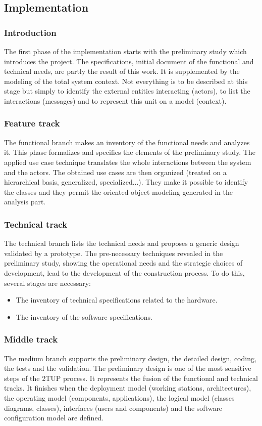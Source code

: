 \subsection{Implementation}
\label{subsec:subsec01}
\subsubsection{Introduction}
\label{subsec:subsec01}
The first phase of the implementation starts with the
preliminary study which introduces the project. The
specifications, initial document of the functional and
technical needs, are partly the result of this work. It is
supplemented by the modeling of the total system context.
Not everything is to be described at this stage but simply
to identify the external entities interacting (actors), to list
the interactions (messages) and to represent this unit on a
model (context).
\subsubsection{Feature track}
\label{subsec:subsec01}
The functional branch makes an inventory of the
functional needs and analyzes it. This phase formalizes
and specifies the elements of the preliminary study. 
The applied use case technique translates the whole
interactions between the system and the actors. The
obtained use cases are then organized (treated on a
hierarchical basis, generalized, specialized...). They make
it possible to identify the classes and they permit the
oriented object modeling generated in the analysis part. 
\subsubsection{Technical track }
\label{subsec:subsec01}
The technical branch lists the technical needs and
proposes a generic design validated by a prototype. The
pre-necessary techniques revealed in the preliminary
study, showing the operational needs and the strategic
choices of development, lead to the development of the
construction process. To do this, several stages are
necessary: 
\begin{itemize}
  \item The inventory of technical specifications related
to the hardware.
  \item The inventory of the software specifications. 
\end{itemize}

\subsubsection{Middle track }
\label{subsec:subsec01}
The medium branch supports the preliminary design, the
detailed design, coding, the tests and the validation. The
preliminary design is one of the most sensitive steps of the
2TUP process. It represents the fusion of the functional
and technical tracks. It finishes when the deployment
model (working stations, architectures), the operating
model (components, applications), the logical model
(classes diagrams, classes), interfaces (users and
components) and the software configuration model are
defined. 

